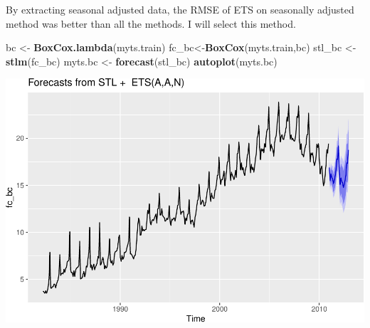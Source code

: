 \documentclass[]{article}
\newenvironment{Shaded}{\begin{snugshade}}{\end{snugshade}}
\newcommand{\KeywordTok}[1]{\textcolor[rgb]{0.13,0.29,0.53}{\textbf{#1}}}
\newcommand{\StringTok}[1]{\textcolor[rgb]{0.31,0.60,0.02}{#1}}
\newcommand{\NormalTok}[1]{#1}
\begin{document}
By extracting seasonal adjusted data, the RMSE of ETS on seasonally
adjusted method was better than all the methods. I will select this
method.

\begin{Shaded}
\begin{Highlighting}[]
\NormalTok{bc <-}\StringTok{ }\KeywordTok{BoxCox.lambda}\NormalTok{(myts.train)}
\NormalTok{fc_bc<-}\KeywordTok{BoxCox}\NormalTok{(myts.train,bc)}
\NormalTok{stl_bc <-}\StringTok{ }\KeywordTok{stlm}\NormalTok{(fc_bc)}
\NormalTok{myts.bc <-}\StringTok{ }\KeywordTok{forecast}\NormalTok{(stl_bc)}
\KeywordTok{autoplot}\NormalTok{(myts.bc)}
\end{Highlighting}
\end{Shaded}

\includegraphics{Hw4_files/figure-latex/unnamed-chunk-24-1.pdf}
\end{document}
